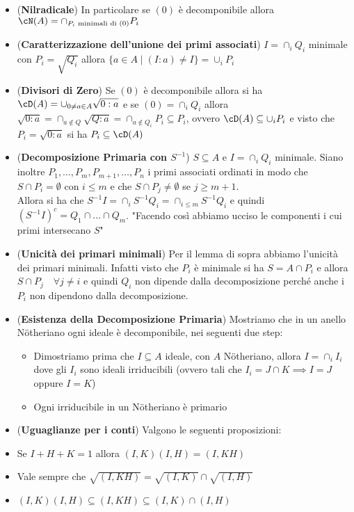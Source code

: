 \documentclass[a4paper,NoNotes,GeneralMath]{stdmdoc}
\begin{document}
\begin{itemize}
		\item ({\bf Nilradicale}) In particolare se $(0)$ è decomponibile allora $\cN(A) = \cap_{P_i \text{ minimali di } (0)} P_i$
		\item ({\bf Caratterizzazione dell'unione dei primi associati}) $I = \cap_i Q_i$ minimale con $P_i = \sqrt{Q_i}$ allora $\{ a \in A \mid (I:a) \neq I \} = \cup_i P_i$
		\item ({\bf Divisori di Zero}) Se $(0)$ è decomponibile allora si ha $\cD(A) = \cup_{0 \neq a \in A} \sqrt{0 : a}$ e se $(0) = \cap_i Q_i$ allora $\sqrt{0:a} = \cap_{a \notin Q} \sqrt{Q:a} = \cap_{a \notin Q_i} P_i \subseteq P_i$, ovvero $\cD(A) \subseteq \cup_i P_i$ e visto che $P_i = \sqrt{0:a}$ si ha $P_i \subseteq \cD(A)$
		\item ({\bf Decomposizione Primaria con $S^{-1}$}) $S \subseteq A$ e $I = \cap_i Q_i$ minimale. Siano inoltre $P_1, \ldots, P_m, P_{m+1}, \ldots, P_n$ i primi associati ordinati in modo che $S \cap P_i = \emptyset$ con $i \le m$ e che $S \cap P_j \neq \emptyset$ se $j \ge m+1$. \\
		Allora si ha che $S^{-1}I = \cap_i S^{-1}Q_i = \cap_{i \le m} S^{-1}Q_i$ e quindi $(S^{-1}I)^c = Q_1 \cap \ldots \cap Q_m$. "Facendo così abbiamo ucciso le componenti i cui primi intersecano $S$" 
		\item ({\bf Unicità dei primari minimali}) Per il lemma di sopra abbiamo l'unicità dei primari minimali. Infatti visto che $P_i$ è minimale si ha $S = A \cap P_i$ e allora $S \cap P_j \quad \forall j \neq i$ e quindi $Q_i$ non dipende dalla decomposizione perché anche i $P_i$ non dipendono dalla decomposizione.
		\item ({\bf Esistenza della Decomposizione Primaria}) Mostriamo che in un anello Nötheriano ogni ideale è decomponibile, nei seguenti due step:
			\begin{itemize}
				\item Dimostriamo prima che $I \subseteq A$ ideale, con $A$ Nötheriano, allora $I = \cap_i I_i$ dove gli $I_i$ sono ideali irriducibili (ovvero tali che $I_i = J \cap K \implies I = J$ oppure $I = K$)
				\item Ogni irriducibile in un Nötheriano è primario
			\end{itemize}
		\item ({\bf Uguaglianze per i conti}) Valgono le seguenti proposizioni:
			\item Se $I + H + K = 1$ allora $(I, K) (I, H) = (I, KH)$
			\item Vale sempre che $\sqrt{(I, KH)} = \sqrt{(I, K)} \cap \sqrt{(I, H)}$
			\item $(I, K)(I, H) \subseteq (I, KH) \subseteq (I, K) \cap (I, H)$
	\end{itemize}
	
\end{document}
